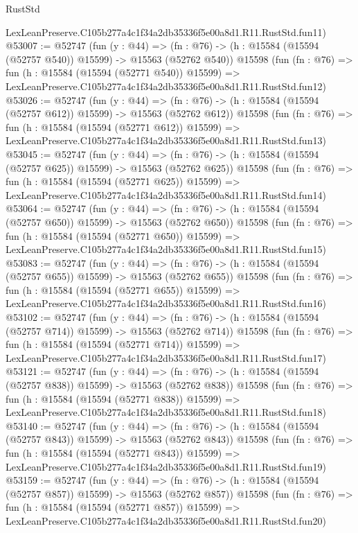 \begin{lexlean}{RustStd}
\begin{coremodule}
    LexLeanPreserve.C105b277a4c1f34a2db35336f5e00a8d1.R11.RustStd.fun11)
@53007 := @52747
    (fun (y : @44) =>
    (fn : @76) -> (h : @15584 (@15594 (@52757 @540)) @15599) -> @15563 (@52762 @540))
    @15598
    (fun (fn : @76) =>
    fun (h : @15584 (@15594 (@52771 @540)) @15599) =>
    LexLeanPreserve.C105b277a4c1f34a2db35336f5e00a8d1.R11.RustStd.fun12)
@53026 := @52747
    (fun (y : @44) =>
    (fn : @76) -> (h : @15584 (@15594 (@52757 @612)) @15599) -> @15563 (@52762 @612))
    @15598
    (fun (fn : @76) =>
    fun (h : @15584 (@15594 (@52771 @612)) @15599) =>
    LexLeanPreserve.C105b277a4c1f34a2db35336f5e00a8d1.R11.RustStd.fun13)
@53045 := @52747
    (fun (y : @44) =>
    (fn : @76) -> (h : @15584 (@15594 (@52757 @625)) @15599) -> @15563 (@52762 @625))
    @15598
    (fun (fn : @76) =>
    fun (h : @15584 (@15594 (@52771 @625)) @15599) =>
    LexLeanPreserve.C105b277a4c1f34a2db35336f5e00a8d1.R11.RustStd.fun14)
@53064 := @52747
    (fun (y : @44) =>
    (fn : @76) -> (h : @15584 (@15594 (@52757 @650)) @15599) -> @15563 (@52762 @650))
    @15598
    (fun (fn : @76) =>
    fun (h : @15584 (@15594 (@52771 @650)) @15599) =>
    LexLeanPreserve.C105b277a4c1f34a2db35336f5e00a8d1.R11.RustStd.fun15)
@53083 := @52747
    (fun (y : @44) =>
    (fn : @76) -> (h : @15584 (@15594 (@52757 @655)) @15599) -> @15563 (@52762 @655))
    @15598
    (fun (fn : @76) =>
    fun (h : @15584 (@15594 (@52771 @655)) @15599) =>
    LexLeanPreserve.C105b277a4c1f34a2db35336f5e00a8d1.R11.RustStd.fun16)
@53102 := @52747
    (fun (y : @44) =>
    (fn : @76) -> (h : @15584 (@15594 (@52757 @714)) @15599) -> @15563 (@52762 @714))
    @15598
    (fun (fn : @76) =>
    fun (h : @15584 (@15594 (@52771 @714)) @15599) =>
    LexLeanPreserve.C105b277a4c1f34a2db35336f5e00a8d1.R11.RustStd.fun17)
@53121 := @52747
    (fun (y : @44) =>
    (fn : @76) -> (h : @15584 (@15594 (@52757 @838)) @15599) -> @15563 (@52762 @838))
    @15598
    (fun (fn : @76) =>
    fun (h : @15584 (@15594 (@52771 @838)) @15599) =>
    LexLeanPreserve.C105b277a4c1f34a2db35336f5e00a8d1.R11.RustStd.fun18)
@53140 := @52747
    (fun (y : @44) =>
    (fn : @76) -> (h : @15584 (@15594 (@52757 @843)) @15599) -> @15563 (@52762 @843))
    @15598
    (fun (fn : @76) =>
    fun (h : @15584 (@15594 (@52771 @843)) @15599) =>
    LexLeanPreserve.C105b277a4c1f34a2db35336f5e00a8d1.R11.RustStd.fun19)
@53159 := @52747
    (fun (y : @44) =>
    (fn : @76) -> (h : @15584 (@15594 (@52757 @857)) @15599) -> @15563 (@52762 @857))
    @15598
    (fun (fn : @76) =>
    fun (h : @15584 (@15594 (@52771 @857)) @15599) =>
    LexLeanPreserve.C105b277a4c1f34a2db35336f5e00a8d1.R11.RustStd.fun20)

\end{coremodule}
\end{lexlean}
